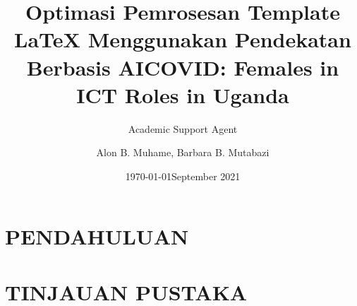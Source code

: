 \documentclass{article}
\title{Optimasi Pemrosesan Template LaTeX Menggunakan Pendekatan Berbasis AI}
\author{Academic Support Agent}
\date{\today}
\begin{document}
\maketitle

\begin{abstract}

\end{abstract}

\chapter{PENDAHULUAN}


\chapter{TINJAUAN PUSTAKA}


\usepackage[utf8]{inputenc}

\title{COVID: Females in ICT Roles in Uganda}
\author{Alon B. Muhame, Barbara B. Mutabazi }
\date{September 2021}
\end{document}
